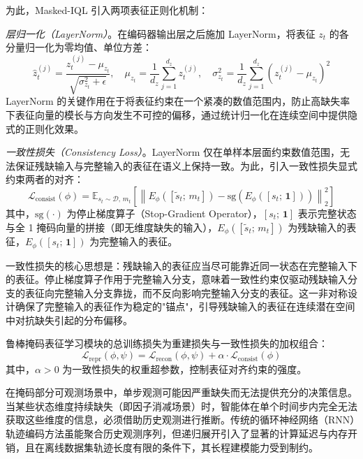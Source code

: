 为此，Masked-IQL 引入两项表征正则化机制：

\textit{层归一化（LayerNorm）}。在编码器输出层之后施加 LayerNorm，将表征 $z_t$ 的各分量归一化为零均值、单位方差：
\begin{equation}
    \hat{z}_t^{(j)} = \frac{z_t^{(j)} - \mu_{z_t}}{\sqrt{\sigma_{z_t}^2 + \epsilon}}, \quad \mu_{z_t} = \frac{1}{d_z}\sum_{j=1}^{d_z} z_t^{(j)}, \quad \sigma_{z_t}^2 = \frac{1}{d_z}\sum_{j=1}^{d_z} (z_t^{(j)} - \mu_{z_t})^2
\end{equation}
LayerNorm 的关键作用在于将表征约束在一个紧凑的数值范围内，防止高缺失率下表征向量的模长与方向发生不可控的偏移，通过统计归一化在连续空间中提供隐式的正则化效果。

\textit{一致性损失（Consistency Loss）}。LayerNorm 仅在单样本层面约束数值范围，无法保证残缺输入与完整输入的表征在语义上保持一致。为此，引入一致性损失显式约束两者的对齐：
\begin{equation}
    \mathcal{L}_{\text{consist}}(\phi) = \mathbb{E}_{s_t \sim \mathcal{D},\, m_t}\!\left[\left\| E_\phi([\tilde{s}_t;\, m_t]) - \text{sg}\!\left(E_\phi([s_t;\, \mathbf{1}])\right) \right\|_2^2\right]
    \label{eq:consist_loss}
\end{equation}
其中，$\text{sg}(\cdot)$ 为停止梯度算子（Stop-Gradient Operator），$[s_t;\, \mathbf{1}]$ 表示完整状态与全 1 掩码向量的拼接（即无维度缺失的输入），$E_\phi([\tilde{s}_t;\, m_t])$ 为残缺输入的表征，$E_\phi([s_t;\, \mathbf{1}])$ 为完整输入的表征。

一致性损失的核心思想是：残缺输入的表征应当尽可能靠近同一状态在完整输入下的表征。停止梯度算子作用于完整输入分支，意味着一致性约束仅驱动残缺输入分支的表征向完整输入分支靠拢，而不反向影响完整输入分支的表征。这一非对称设计确保了完整输入的表征作为稳定的"锚点"，引导残缺输入的表征在连续潜在空间中对抗缺失引起的分布偏移。

鲁棒掩码表征学习模块的总训练损失为重建损失与一致性损失的加权组合：
\begin{equation}
    \mathcal{L}_{\text{repr}}(\phi, \psi) = \mathcal{L}_{\text{recon}}(\phi, \psi) + \alpha \cdot \mathcal{L}_{\text{consist}}(\phi)
    \label{eq:repr_loss}
\end{equation}
其中，$\alpha > 0$ 为一致性损失的权重超参数，控制表征对齐约束的强度。


在掩码部分可观测场景中，单步观测可能因严重缺失而无法提供充分的决策信息。当某些状态维度持续缺失（即因子消减场景）时，智能体在单个时间步内完全无法获取这些维度的信息，必须借助历史观测进行推断。传统的循环神经网络（RNN）轨迹编码方法虽能聚合历史观测序列，但递归展开引入了显著的计算延迟与内存开销，且在离线数据集轨迹长度有限的条件下，其长程建模能力受到制约。

